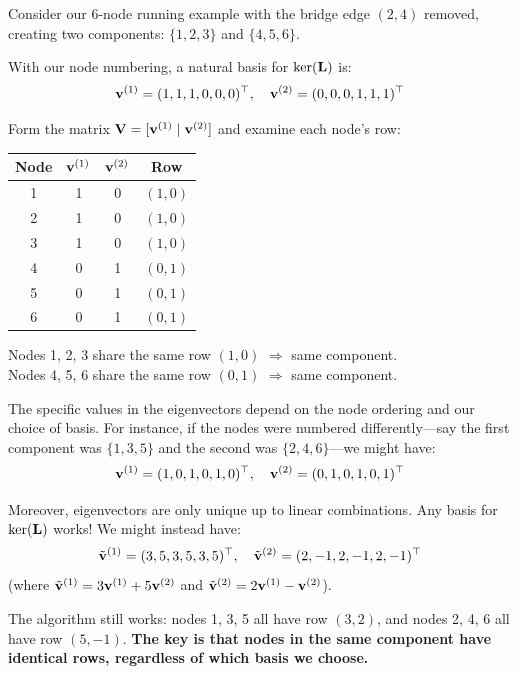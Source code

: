 \begin{notechapter}
\begin{example}
Consider our 6-node running example with the bridge edge $(2,4)$ removed, creating two components: $\{1, 2, 3\}$ and $\{4, 5, 6\}$.

With our node numbering, a natural basis for $\ker(\mathbf{L})$ is:
\[
\mathbf{v}^{(1)} = (1,1,1,0,0,0)^\top, \quad \mathbf{v}^{(2)} = (0,0,0,1,1,1)^\top
\]

Form the matrix $\mathbf{V} = [\mathbf{v}^{(1)} \mid \mathbf{v}^{(2)}]$ and examine each node's row:

\begin{center}
\begin{tabular}{c|cc|c}
\textbf{Node} & $\mathbf{v}^{(1)}$ & $\mathbf{v}^{(2)}$ & \textbf{Row} \\
\hline
1 & 1 & 0 & $(1, 0)$ \\
2 & 1 & 0 & $(1, 0)$ \\
3 & 1 & 0 & $(1, 0)$ \\
4 & 0 & 1 & $(0, 1)$ \\
5 & 0 & 1 & $(0, 1)$ \\
6 & 0 & 1 & $(0, 1)$ \\
\end{tabular}
\end{center}

Nodes 1, 2, 3 share the same row $(1, 0)$ $\Rightarrow$ same component.\\
Nodes 4, 5, 6 share the same row $(0, 1)$ $\Rightarrow$ same component.
\end{example}

\begin{remark}
The specific values in the eigenvectors depend on the node ordering and our choice of basis. For instance, if the nodes were numbered differently---say the first component was $\{1, 3, 5\}$ and the second was $\{2, 4, 6\}$---we might have:
\[
\mathbf{v}^{(1)} = (1,0,1,0,1,0)^\top, \quad \mathbf{v}^{(2)} = (0,1,0,1,0,1)^\top
\]

Moreover, eigenvectors are only unique up to linear combinations. Any basis for $\ker(\mathbf{L})$ works! We might instead have:
\[
\tilde{\mathbf{v}}^{(1)} = (3,5,3,5,3,5)^\top, \quad \tilde{\mathbf{v}}^{(2)} = (2,-1,2,-1,2,-1)^\top
\]
(where $\tilde{\mathbf{v}}^{(1)} = 3\mathbf{v}^{(1)} + 5\mathbf{v}^{(2)}$ and $\tilde{\mathbf{v}}^{(2)} = 2\mathbf{v}^{(1)} - \mathbf{v}^{(2)}$).

The algorithm still works: nodes 1, 3, 5 all have row $(3, 2)$, and nodes 2, 4, 6 all have row $(5, -1)$. \textbf{The key is that nodes in the same component have identical rows, regardless of which basis we choose.}
\end{remark}


\end{notechapter}
